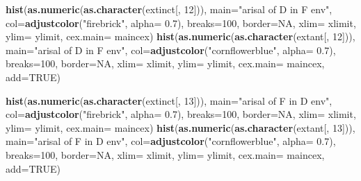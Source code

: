 \documentclass[]{book}
\newenvironment{Shaded}{\begin{snugshade}}{\end{snugshade}}
\newcommand{\KeywordTok}[1]{\textcolor[rgb]{0.13,0.29,0.53}{\textbf{{#1}}}}
\newcommand{\DataTypeTok}[1]{\textcolor[rgb]{0.13,0.29,0.53}{{#1}}}
\newcommand{\DecValTok}[1]{\textcolor[rgb]{0.00,0.00,0.81}{{#1}}}
\newcommand{\FloatTok}[1]{\textcolor[rgb]{0.00,0.00,0.81}{{#1}}}
\newcommand{\StringTok}[1]{\textcolor[rgb]{0.31,0.60,0.02}{{#1}}}
\newcommand{\OtherTok}[1]{\textcolor[rgb]{0.56,0.35,0.01}{{#1}}}
\newcommand{\NormalTok}[1]{{#1}}
\theoremstyle{definition}
\theoremstyle{definition}
\theoremstyle{definition}
\theoremstyle{remark}
\begin{document}
\begin{Shaded}
\begin{Highlighting}[]
\KeywordTok{hist}\NormalTok{(}\KeywordTok{as.numeric}\NormalTok{(}\KeywordTok{as.character}\NormalTok{(extinct[, }\DecValTok{12}\NormalTok{])), }\DataTypeTok{main=}\StringTok{"arisal of D in F env"}\NormalTok{, }\DataTypeTok{col=}\KeywordTok{adjustcolor}\NormalTok{(}\StringTok{"firebrick"}\NormalTok{, }\DataTypeTok{alpha=} \FloatTok{0.7}\NormalTok{), }\DataTypeTok{breaks=}\DecValTok{100}\NormalTok{, }\DataTypeTok{border=}\OtherTok{NA}\NormalTok{, }\DataTypeTok{xlim=}\NormalTok{ xlimit, }\DataTypeTok{ylim=}\NormalTok{ ylimit, }\DataTypeTok{cex.main=}\NormalTok{ maincex)}
\KeywordTok{hist}\NormalTok{(}\KeywordTok{as.numeric}\NormalTok{(}\KeywordTok{as.character}\NormalTok{(extant[, }\DecValTok{12}\NormalTok{])), }\DataTypeTok{main=}\StringTok{"arisal of D in F env"}\NormalTok{, }\DataTypeTok{col=}\KeywordTok{adjustcolor}\NormalTok{(}\StringTok{"cornflowerblue"}\NormalTok{, }\DataTypeTok{alpha=} \FloatTok{0.7}\NormalTok{), }\DataTypeTok{breaks=}\DecValTok{100}\NormalTok{, }\DataTypeTok{border=}\OtherTok{NA}\NormalTok{, }\DataTypeTok{xlim=}\NormalTok{ xlimit, }\DataTypeTok{ylim=}\NormalTok{ ylimit, }\DataTypeTok{cex.main=}\NormalTok{ maincex, }\DataTypeTok{add=}\OtherTok{TRUE}\NormalTok{)}

\KeywordTok{hist}\NormalTok{(}\KeywordTok{as.numeric}\NormalTok{(}\KeywordTok{as.character}\NormalTok{(extinct[, }\DecValTok{13}\NormalTok{])), }\DataTypeTok{main=}\StringTok{"arisal of F in D env"}\NormalTok{, }\DataTypeTok{col=}\KeywordTok{adjustcolor}\NormalTok{(}\StringTok{"firebrick"}\NormalTok{, }\DataTypeTok{alpha=} \FloatTok{0.7}\NormalTok{), }\DataTypeTok{breaks=}\DecValTok{100}\NormalTok{, }\DataTypeTok{border=}\OtherTok{NA}\NormalTok{, }\DataTypeTok{xlim=}\NormalTok{ xlimit, }\DataTypeTok{ylim=}\NormalTok{ ylimit, }\DataTypeTok{cex.main=}\NormalTok{ maincex)}
\KeywordTok{hist}\NormalTok{(}\KeywordTok{as.numeric}\NormalTok{(}\KeywordTok{as.character}\NormalTok{(extant[, }\DecValTok{13}\NormalTok{])), }\DataTypeTok{main=}\StringTok{"arisal of F in D env"}\NormalTok{, }\DataTypeTok{col=}\KeywordTok{adjustcolor}\NormalTok{(}\StringTok{"cornflowerblue"}\NormalTok{, }\DataTypeTok{alpha=} \FloatTok{0.7}\NormalTok{), }\DataTypeTok{breaks=}\DecValTok{100}\NormalTok{, }\DataTypeTok{border=}\OtherTok{NA}\NormalTok{, }\DataTypeTok{xlim=}\NormalTok{ xlimit, }\DataTypeTok{ylim=}\NormalTok{ ylimit, }\DataTypeTok{cex.main=}\NormalTok{ maincex, }\DataTypeTok{add=}\OtherTok{TRUE}\NormalTok{)}


\end{Highlighting}
\end{Shaded}
\end{document}
